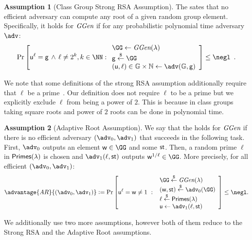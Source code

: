 \documentclass{article}
\theoremstyle{definition}
\newtheorem{assumption}{Assumption}
\begin{document}
\begin{assumption}[Class Group Strong RSA Assumption]
\label{assum:strongRSA}
The  sates that no efficient adversary can compute any root of a given random group element. Specifically, it holds for $\textit{GGen}$ if for any probabilistic polynomial time adversary $\adv$:
\[
    \Pr\left[\gr{u}^\ell = \gr{g} \, \wedge \, \ell\neq 2^k, k \in \NN:
    \begin{array}{l}
         \GG \leftarrow \ggen(\lambda)  \\
         \gr{g} \sample \GG \\
         (\gr{u}, \ell) \in \mathbb{G} \times \mathbb{N} \leftarrow \adv(\mathbb{G}, \gr{g}) \\
    \end{array}\right] \leq \negl \enspace .
\]
\end{assumption} 
We note that some definitions of the strong RSA assumption additionally require that $\ell$ be a prime~\cite{EC:BarPfi97}. Our definition does not require $\ell$ to be a prime but we explicitly exclude $\ell$ from being a power of $2$. This is because in class groups taking square roots and power of $2$ roots can be done in polynomial time\cite{bosma1996computation}.
\begin{assumption}[Adaptive Root Assumption]
\label{assum:adaptiveroot}
We say that the  holds for $\textit{GGen}$ if 
there is no efficient adversary $(\adv_0,\adv_1)$ that succeeds 
in the following task.
First, $\adv_0$ outputs an element $\gr{w} \in \GG$ and some $\textsf{st}$.
Then, a random prime $\ell$ in $\textsf{Primes}(\lambda)$ is chosen
and $\adv_1(\ell,\state)$ outputs $\gr{w}^{1/\ell} \in \GG$.
More precisely, for all efficient $(\adv_0,\adv_1)$:
\[           \advantage{AR}{(\adv_0,\adv_1)}\deq 
                \Pr\left[\gr{u}^\ell = \gr{w} \neq 1 \ : \ 
                \begin{array}{l}
                      \GG \sample \ggen(\lambda) \\ 
                      (\gr{w},\state) \sample \adv_0(\GG) \\
                      \ell \sample \primes \\ 
                      \gr{u} \gets \adv_1(\ell, \state)
                \end{array} 
        \right] \leq \negl.
\]
\end{assumption}

We additionally use two more assumptions, however both of them reduce to the Strong RSA and the Adaptive Root assumptions.
\end{document}
